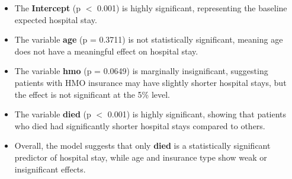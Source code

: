 \documentclass[12pt,a4paper]{report}
\begin{document}
\begin{tcolorbox}[colback=blue!5!white,colframe=blue!70!black,title=Interpretation]
\begin{itemize}
    \item The \textbf{Intercept} (p $<$ 0.001) is highly significant, representing the baseline expected hospital stay.
    \item The variable \textbf{age} (p = 0.3711) is not statistically significant, meaning age does not have a meaningful effect on hospital stay.
    \item The variable \textbf{hmo} (p = 0.0649) is marginally insignificant, suggesting patients with HMO insurance may have slightly shorter hospital stays, but the effect is not significant at the 5\% level.
    \item The variable \textbf{died} (p $<$ 0.001) is highly significant, showing that patients who died had significantly shorter hospital stays compared to others.
    \item Overall, the model suggests that only \textbf{died} is a statistically significant predictor of hospital stay, while age and insurance type show weak or insignificant effects.
\end{itemize}
\end{tcolorbox}
\end{document}
